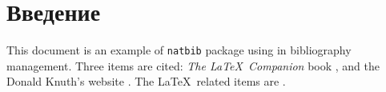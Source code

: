 \section{Введение}
This document is an example of \texttt{natbib} package using in bibliography management. Three items are cited: \textit{The \LaTeX\ Companion} book  \cite{харари1973теория}, and the Donald Knuth's website \cite{knuthwebsite}. The \LaTeX\ related items are \cite{latexcompanion,knuthwebsite}.

\clearpage